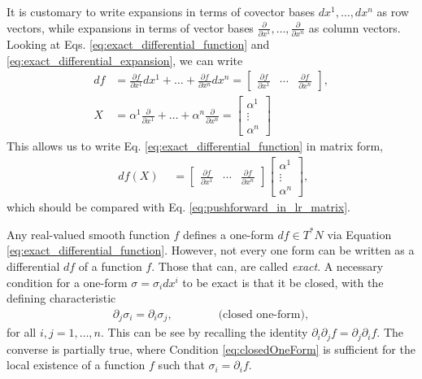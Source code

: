 \begin{remark}
It is customary to write expansions in terms of covector bases $dx^1, \dots, dx^n$ as row vectors, while expansions in terms of vector bases $\frac{\partial}{\partial x^1}, \dots, \frac{\partial}{\partial x^n} $ as column vectors. Looking at Eqs. \ref{eq:exact_differential_function} and \ref{eq:exact_differential_expansion}, we can write
\begin{align}\label{row_and_column_vectors}
df &= \frac{\partial f}{\partial x^1} dx^1+\dots + \frac{\partial f}{\partial x^n} dx^n
 = {} 
\left[\begin{array}{ccc}
\frac{\partial f}{\partial x^1}  & \cdots & \frac{\partial f}{\partial x^n}
\end{array}\right],\\
X &= \alpha^1 \frac{\partial}{\partial x^1} +\dots + \alpha^n \frac{\partial}{\partial x^n} = \left[\begin{array}{c}
 \alpha^1\\
\vdots\\
\alpha^n
  \end{array} \right]
\end{align}
This allows us to write Eq. \ref{eq:exact_differential_function} in matrix form,  
\begin{align}\label{exact_differential_matrix}
\begin{array}{c}
df(X) \end{array}  
& = {} 
\left[\begin{array}{ccc}
\frac{\partial f}{\partial x^1}  & \cdots & \frac{\partial f}{\partial x^n}
\end{array}\right]
\left[\begin{array}{c}
 \alpha^1\\
\vdots\\
\alpha^n
  \end{array} \right],
\end{align}
which should be compared with Eq. \ref{eq:pushforward_in_lr_matrix}.
\end{remark}


Any real-valued smooth function $f$ defines a one-form $df\in T^*N$ via Equation \ref{eq:exact_differential_function}. However, not every one form can be written as a differential $df$ of a function $f$. Those that can, are called \textit{exact}. A necessary condition for a one-form $\sigma = \sigma_i dx^i$ to be exact is that it be closed, with the defining characteristic 
\begin{align}\label{eq:closedOneForm}
\partial_j \sigma_i = \partial_i \sigma_j, \qquad \qquad \text{(closed one-form)},
\end{align}
 for all $i, j = 1, \dots, n$. This can be see by recalling the identity $\partial_i \partial_j f = \partial_j \partial_i f$. The converse is partially true, where Condition \ref{eq:closedOneForm} is sufficient for the local existence of a function $f$ such that $\sigma_i = \partial_i f$. 

